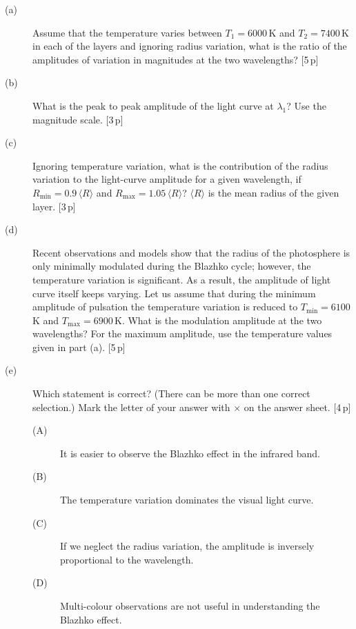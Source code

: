 \begin{description}
\item[(a)] Assume that the temperature varies between $T_1 = 6000$\,K and
  $T_2 = 7400$\,K in each of the layers and ignoring radius variation, what
  is the ratio of the amplitudes of variation in magnitudes at the two
  wavelengths? \hfill[5\,p]
\item[(b)] What is the peak to peak amplitude of the light curve at
  $\lambda_1$? Use the magnitude scale. \hfill[3\,p]
\item[(c)] Ignoring temperature variation, what is the contribution of the
  radius variation to the light-curve amplitude for a given wavelength, if
  $R_{\min} = 0.9\,\langle R\rangle$ and
  $R_{\max} = 1.05\,\langle R\rangle$? $\langle R\rangle$ is the mean radius
  of the given layer. \hfill[3\,p]
\item[(d)] Recent observations and models show that the radius of the
  photosphere is only minimally modulated during the Blazhko cycle; however,
  the temperature variation is significant. As a result, the amplitude of
  light curve itself keeps varying. Let us assume that during the minimum
  amplitude of pulsation the temperature variation is reduced to
  $T_{\min} = 6100$\,K and $T_{\max} = 6900$\,K. What is the modulation
  amplitude at the two wavelengths? For the maximum amplitude, use the
  temperature values given in part (a). \hfill[5\,p]
\item[(e)] Which statement is correct? (There can be more than one correct
  selection.) Mark the letter of your answer with $\times$ on the answer
  sheet. \hfill[4\,p]
  \begin{description}
  \item[(A)] It is easier to observe the Blazhko effect in the infrared
    band.
  \item[(B)] The temperature variation dominates the visual light curve.
  \item[(C)] If we neglect the radius variation, the amplitude is inversely
    proportional to the wavelength.
  \item[(D)] Multi-colour observations are not useful in understanding the
    Blazhko effect.
  \end{description}
\end{description}
